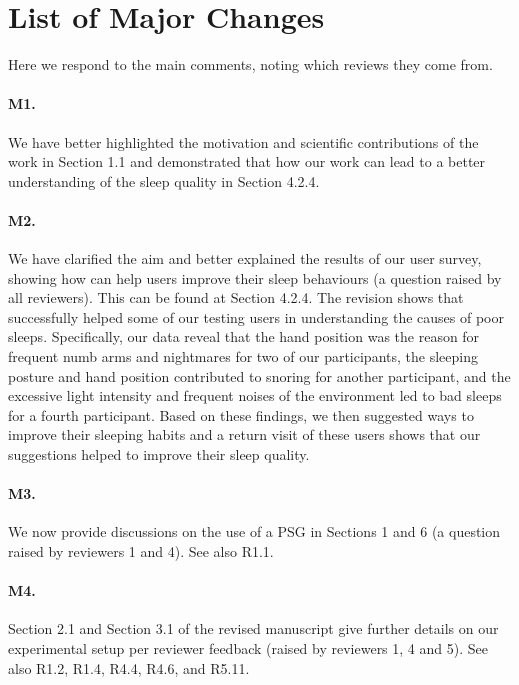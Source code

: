 \section*{List of Major Changes}

Here we respond to the main comments, noting which reviews they come from.

\paragraph{M1.} We have better highlighted the motivation and scientific contributions of the work in Section 1.1 and demonstrated that how our work can lead to
a better understanding of the sleep quality in Section 4.2.4.

\paragraph{M2.} We have clarified the aim and better explained the results of our user survey, showing how \systemname can help users
improve their sleep behaviours (a question raised by all reviewers). This can be found at Section 4.2.4. The revision shows that
\systemname successfully helped some of our testing users in understanding the causes of poor sleeps. Specifically, our data reveal that
the hand position was the reason for frequent numb arms and nightmares for two of our participants, the sleeping posture and hand position
contributed to snoring for another participant, and the excessive light intensity and frequent noises of the environment led to bad sleeps
for a fourth participant. Based on these findings, we then suggested ways to improve their sleeping habits and a return visit of these
users shows that our suggestions helped to improve their sleep quality.

\paragraph{M3.} We now provide discussions on the use of a PSG in Sections 1 and 6 (a question raised by reviewers 1 and 4). See also R1.1.

\paragraph{M4.} Section 2.1 and Section 3.1 of the revised manuscript give further details on our experimental setup per reviewer feedback (raised by reviewers 1, 4 and 5). See also R1.2, R1.4, R4.4, R4.6, and R5.11.


